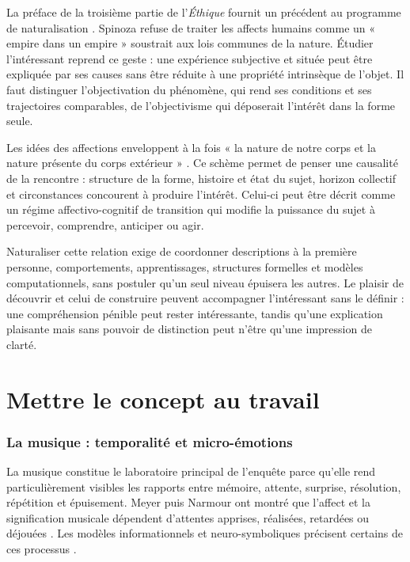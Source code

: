 \documentclass[11pt,a4paper]{article}
\begin{document}
La préface de la troisième partie de l'\emph{Éthique} fournit un précédent au
programme de naturalisation \parencite{spinoza1966ethique}. Spinoza refuse de
traiter les affects humains comme un « empire dans un empire » soustrait aux
lois communes de la nature. Étudier l'intéressant reprend ce geste : une
expérience subjective et située peut être expliquée par ses causes sans être
réduite à une propriété intrinsèque de l'objet. Il faut distinguer
l'objectivation du phénomène, qui rend ses conditions et ses trajectoires
comparables, de l'objectivisme qui déposerait l'intérêt dans la forme seule.

Les idées des affections enveloppent à la fois « la nature de notre corps et la
nature présente du corps extérieur »
\parencite[III, prop. XXVII, dém.]{spinoza1861oeuvres}. Ce schème permet de
penser une causalité de la rencontre : structure de la forme, histoire et état
du sujet, horizon collectif et circonstances concourent à produire l'intérêt.
Celui-ci peut être décrit comme un régime affectivo-cognitif de transition qui
modifie la puissance du sujet à percevoir, comprendre, anticiper ou agir.

Naturaliser cette relation exige de coordonner descriptions à la première
personne, comportements, apprentissages, structures formelles et modèles
computationnels, sans postuler qu'un seul niveau épuisera les autres. Le plaisir
de découvrir et celui de construire
\parencite{feynman1999pleasure,florman1996existential} peuvent accompagner
l'intéressant sans le définir : une compréhension pénible peut rester
intéressante, tandis qu'une explication plaisante mais sans pouvoir de
distinction peut n'être qu'une impression de clarté.

\part{Mettre le concept au travail}

\section{La musique : temporalité et micro-émotions}

La musique constitue le laboratoire principal de l'enquête parce qu'elle rend
particulièrement visibles les rapports entre mémoire, attente, surprise,
résolution, répétition et épuisement. Meyer puis Narmour ont montré que l'affect
et la signification musicale dépendent d'attentes apprises, réalisées, retardées
ou déjouées
\parencite{meyer1956emotion,narmour1990basic,narmour1992complexity}. Les modèles
informationnels et neuro-symboliques précisent certains de ces processus
\parencite{abdallah2009information,berger1999expectations,gang1999unified}.
\end{document}
